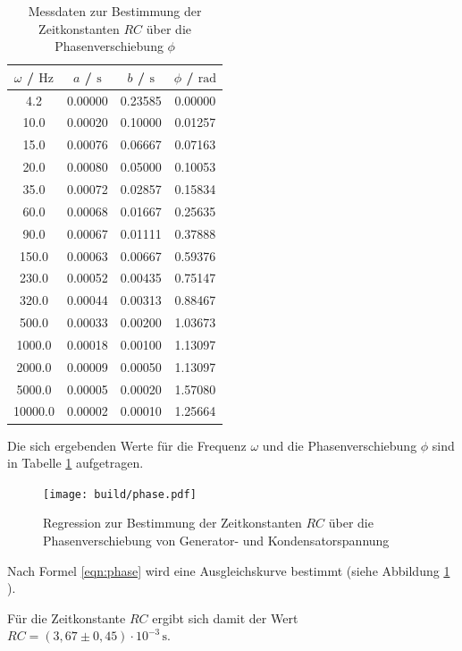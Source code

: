 \begin{table}
	\caption{Messdaten zur Bestimmung der Zeitkonstanten $RC$ über die Phasenverschiebung $\phi$}
	\label{tab:phasen}
	\centering
	\begin{tabular}{cccc}
		\toprule
		$\omega$ / $\si{\Hz}$ & $a$ / $\si{\second}$ & $b$ / $\si{\second}$& $\phi$ / $\si{\radian}$ \\
		\midrule
		4.2 & 0.00000 & 0.23585 & 0.00000 \\
		10.0 & 0.00020 & 0.10000 & 0.01257 \\
		15.0 & 0.00076 & 0.06667 & 0.07163 \\
		20.0 & 0.00080 & 0.05000 & 0.10053 \\
		35.0 & 0.00072 & 0.02857 & 0.15834 \\
		60.0 & 0.00068 & 0.01667 & 0.25635 \\
		90.0 & 0.00067 & 0.01111 & 0.37888 \\
		150.0 & 0.00063 & 0.00667 & 0.59376 \\
		230.0 & 0.00052 & 0.00435 & 0.75147 \\
		320.0 & 0.00044 & 0.00313 & 0.88467 \\
		500.0 & 0.00033 & 0.00200 & 1.03673 \\
		1000.0 & 0.00018 & 0.00100 & 1.13097 \\
		2000.0 & 0.00009 & 0.00050 & 1.13097 \\
		5000.0 & 0.00005 & 0.00020 & 1.57080 \\
		10000.0 & 0.00002 & 0.00010 & 1.25664 \\
		\bottomrule
	\end{tabular}
\end{table}

Die sich ergebenden Werte für die Frequenz $\omega$ und die Phasenverschiebung $\phi$ sind in Tabelle \ref{tab:phasen} aufgetragen.

\begin{figure}
	\centering
	\texttt{[image: build/phase.pdf]}
	\caption{Regression zur Bestimmung der Zeitkonstanten $RC$ über die Phasenverschiebung von Generator- und Kondensatorspannung}
	\label{fig:phasi}
\end{figure}



Nach Formel \eqref{eqn:phase} wird eine Ausgleichskurve bestimmt (siehe Abbildung \ref{fig:phasi}
).

Für die Zeitkonstante $RC$ ergibt sich damit der Wert $RC = (3,67 \pm 0,45) \cdot 10^{-3} \, \si{\second}$.

